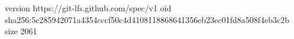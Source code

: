 version https://git-lfs.github.com/spec/v1
oid sha256:5c285942071a4354cccf50c4d4108118868641356eb23ec01fd8a508f4eb3c2b
size 2061
